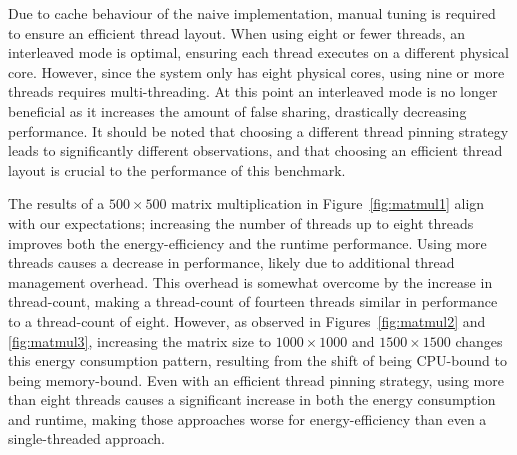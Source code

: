 Due to cache behaviour of the naive implementation, manual tuning is required to ensure an efficient
thread layout. When using eight or fewer threads, an interleaved mode is optimal, ensuring each
thread executes on a different physical core. However, since the system only has eight physical
cores, using nine or more threads requires multi-threading. At this point an interleaved mode is no
longer beneficial as it increases the amount of false sharing, drastically decreasing performance.
It should be noted that choosing a different thread pinning strategy leads to significantly
different observations, and that choosing an efficient thread layout is crucial to the performance
of this benchmark.

The results of a $500 \times 500$ matrix multiplication in Figure~\ref{fig:matmul1} align with our
expectations; increasing the number of threads up to eight threads improves both the
energy-efficiency and the runtime performance. Using more threads causes a decrease in performance,
likely due to additional thread management overhead. This overhead is somewhat overcome by the
increase in thread-count, making a thread-count of fourteen threads similar in performance to a
thread-count of eight. However, as observed in Figures~\ref{fig:matmul2} and \ref{fig:matmul3},
increasing the matrix size to $1000 \times 1000$ and $1500 \times 1500$ changes this energy
consumption pattern, resulting from the shift of being CPU-bound to being memory-bound. Even with an
efficient thread pinning strategy, using more than eight threads causes a significant increase in
both the energy consumption and runtime, making those approaches worse for energy-efficiency than
even a single-threaded approach.

